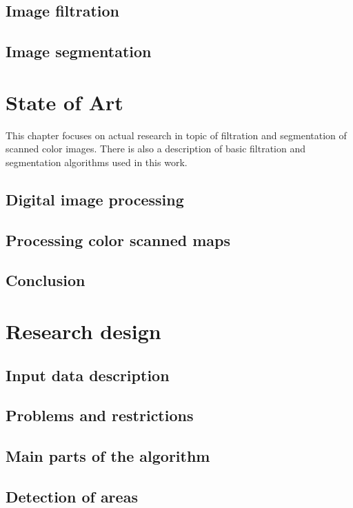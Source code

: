 \documentclass[a4paper,onecolumn,oneside,12pt]{memoir}
\begin{document}
\section{Image filtration}

\section{Image segmentation}

\chapter{State of Art}

This chapter focuses on actual research in topic of filtration and segmentation of scanned color images.
There is also a description of basic filtration and segmentation algorithms used in this work.

\section{Digital image processing}

\section{Processing color scanned maps}

\section{Conclusion}


\chapter{Research design}

\section{Input data description}

\section{Problems and restrictions}

\section{Main parts of the algorithm}

\section{Detection of areas}
\end{document}
